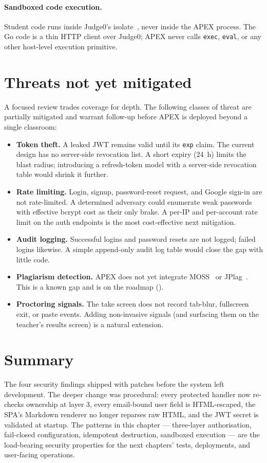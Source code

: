 \paragraph{Sandboxed code execution.} Student code runs inside Judge0's isolate~\cite{judge0,isolate}, never inside the APEX process. The Go code is a thin HTTP client over Judge0; APEX never calls \texttt{exec}, \texttt{eval}, or any other host-level execution primitive.

\section{Threats not yet mitigated}

A focused review trades coverage for depth. The following classes of threat are partially mitigated and warrant follow-up before APEX is deployed beyond a single classroom:

\begin{itemize}
  \item \textbf{Token theft.} A leaked JWT remains valid until its \texttt{exp} claim. The current design has no server-side revocation list. A short expiry (24~h) limits the blast radius; introducing a refresh-token model with a server-side revocation table would shrink it further.
  \item \textbf{Rate limiting.} Login, signup, password-reset request, and Google sign-in are not rate-limited. A determined adversary could enumerate weak passwords with effective bcrypt cost as their only brake. A per-IP and per-account rate limit on the auth endpoints is the most cost-effective next mitigation.
  \item \textbf{Audit logging.} Successful logins and password resets are not logged; failed logins likewise. A simple append-only audit log table would close the gap with little code.
  \item \textbf{Plagiarism detection.} APEX does not yet integrate MOSS~\cite{moss} or JPlag~\cite{prechelt2002jplag}. This is a known gap and is on the roadmap ().
  \item \textbf{Proctoring signals.} The take screen does not record tab-blur, fullscreen exit, or paste events. Adding non-invasive signals (and surfacing them on the teacher's results screen) is a natural extension.
\end{itemize}

\section{Summary}

The four security findings shipped with patches before the system left development. The deeper change was procedural: every protected handler now re-checks ownership at layer 3, every email-bound user field is HTML-escaped, the SPA's Markdown renderer no longer reparses raw HTML, and the JWT secret is validated at startup. The patterns in this chapter --- three-layer authorisation, fail-closed configuration, idempotent destruction, sandboxed execution --- are the load-bearing security properties for the next chapters' tests, deployments, and user-facing operations.
